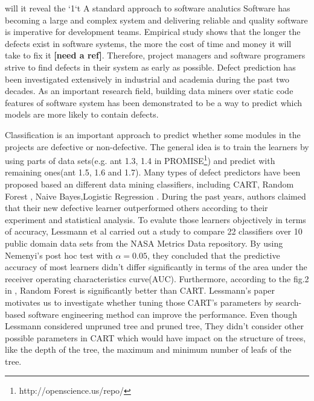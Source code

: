 \documentclass{sig-alternative}
\begin{document}
will it reveal the `1`t
A standard approach to software analutics
Software has becoming a large and complex system and delivering reliable and quality 
software is imperative for development teams. Empirical study shows that the longer the 
defects exist in software systems, the more the cost of time and money it will take to fix it 
\textbf{ [need a ref]}. Therefore, project managers and software programers strive to find 
defects in their system as early as possible. Defect prediction has been investigated 
extensively in industrial and academia during the past two decades. As an important research 
field, building data miners  \cite{lessmann2008benchmarking, mccabe1976complexity, 
menzies2007data, menzies2010defect, jiang2008can, menzies2011local, song2011general} 
over static code features of software system has been demonstrated to be a way to predict 
which models are more likely to contain defects.

Classification is an important approach to predict whether some modules in the projects are 
defective or non-defective. The general idea is to train the learners by using parts of data 
sets(e.g. ant 1.3, 1.4 in PROMISE\footnote{http://openscience.us/repo/}) and predict with 
remaining ones(ant 1.5, 1.6 and 1.7). Many types of defect predictors have been proposed 
based an different data mining classifiers, including CART, Random Forest 
\cite{guo2004robust},  Naive Bayes\cite{menzies2007data},Logistic Regression 
\cite{khoshgoftaar1999logistic}. During the past years, authors claimed that their new 
defective learner outperformed others according to their experiment and statistical analysis. 
To evalute those learners objectively in terms of accuracy, Lessmann et al
\cite{lessmann2008benchmarking} carried out a study to compare 22 classifiers over 10 public 
domain data sets from the NASA Metrics Data repository. By using Nemenyi's post hoc test 
with $\alpha = 0.05$, they concluded that the predictive accuracy of most learners didn't differ 
significantly in terms of the area under the receiver operating characteristics curve(AUC). 
Furthermore, according to the fig.2 in \cite{lessmann2008benchmarking}, Random Forest is 
significantly better than CART. Lessmann's paper motivates us to investigate whether tuning 
those CART's parameters by search-based software engineering method can improve the 
performance. Even though Lessmann considered unpruned tree and pruned tree, They didn't 
consider other possible parameters in CART which would have impact on the structure of 
trees, like the depth of the tree, the maximum and minimum number of leafs of the tree.
\end{document}
